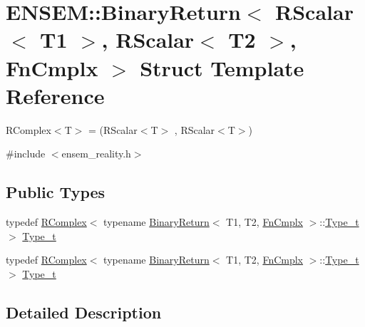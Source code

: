 \hypertarget{structENSEM_1_1BinaryReturn_3_01RScalar_3_01T1_01_4_00_01RScalar_3_01T2_01_4_00_01FnCmplx_01_4}{}\section{E\+N\+S\+EM\+:\+:Binary\+Return$<$ R\+Scalar$<$ T1 $>$, R\+Scalar$<$ T2 $>$, Fn\+Cmplx $>$ Struct Template Reference}
\label{structENSEM_1_1BinaryReturn_3_01RScalar_3_01T1_01_4_00_01RScalar_3_01T2_01_4_00_01FnCmplx_01_4}


R\+Complex$<$\+T$>$ = (R\+Scalar$<$\+T$>$ , R\+Scalar$<$\+T$>$)  




{\ttfamily \#include $<$ensem\+\_\+reality.\+h$>$}

\subsection*{Public Types}
\begin{DoxyCompactItemize}
\item 
typedef \mbox{\hyperlink{classENSEM_1_1RComplex}{R\+Complex}}$<$ typename \mbox{\hyperlink{structENSEM_1_1BinaryReturn}{Binary\+Return}}$<$ T1, T2, \mbox{\hyperlink{structENSEM_1_1FnCmplx}{Fn\+Cmplx}} $>$\+::\mbox{\hyperlink{structENSEM_1_1BinaryReturn_3_01RScalar_3_01T1_01_4_00_01RScalar_3_01T2_01_4_00_01FnCmplx_01_4_a478f881e6acca67db287ec50e606ace1}{Type\+\_\+t}} $>$ \mbox{\hyperlink{structENSEM_1_1BinaryReturn_3_01RScalar_3_01T1_01_4_00_01RScalar_3_01T2_01_4_00_01FnCmplx_01_4_a478f881e6acca67db287ec50e606ace1}{Type\+\_\+t}}
\item 
typedef \mbox{\hyperlink{classENSEM_1_1RComplex}{R\+Complex}}$<$ typename \mbox{\hyperlink{structENSEM_1_1BinaryReturn}{Binary\+Return}}$<$ T1, T2, \mbox{\hyperlink{structENSEM_1_1FnCmplx}{Fn\+Cmplx}} $>$\+::\mbox{\hyperlink{structENSEM_1_1BinaryReturn_3_01RScalar_3_01T1_01_4_00_01RScalar_3_01T2_01_4_00_01FnCmplx_01_4_a478f881e6acca67db287ec50e606ace1}{Type\+\_\+t}} $>$ \mbox{\hyperlink{structENSEM_1_1BinaryReturn_3_01RScalar_3_01T1_01_4_00_01RScalar_3_01T2_01_4_00_01FnCmplx_01_4_a478f881e6acca67db287ec50e606ace1}{Type\+\_\+t}}
\end{DoxyCompactItemize}


\subsection{Detailed Description}
